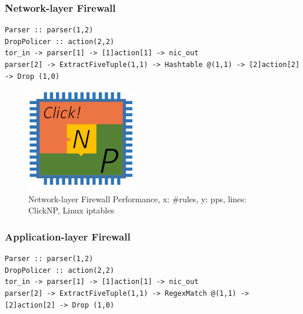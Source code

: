 {\subsubsection{Network-layer Firewall}

\begin{lstlisting}
Parser :: parser(1,2)
DropPolicer :: action(2,2)
tor_in -> parser[1] -> [1]action[1] -> nic_out
parser[2] -> ExtractFiveTuple(1,1) -> Hashtable @(1,1) -> [2]action[2] -> Drop (1,0)
\end{lstlisting}

\begin{figure}[h!]
	\centering
	\includegraphics[width=0.6\columnwidth]{image/logo}
	\vspace{-0.15in}
	\caption{Network-layer Firewall Performance, x: \#rules, y: pps, lines: ClickNP, Linux iptables}
	\vspace{-0.15in}
	\label{clicknp:fig:FirewallPerformance}
\end{figure}

\subsubsection{Application-layer Firewall}

\begin{lstlisting}
Parser :: parser(1,2)
DropPolicer :: action(2,2)
tor_in -> parser[1] -> [1]action[1] -> nic_out
parser[2] -> ExtractFiveTuple(1,1) -> RegexMatch @(1,1) -> [2]action[2] -> Drop (1,0)
\end{lstlisting}

}
